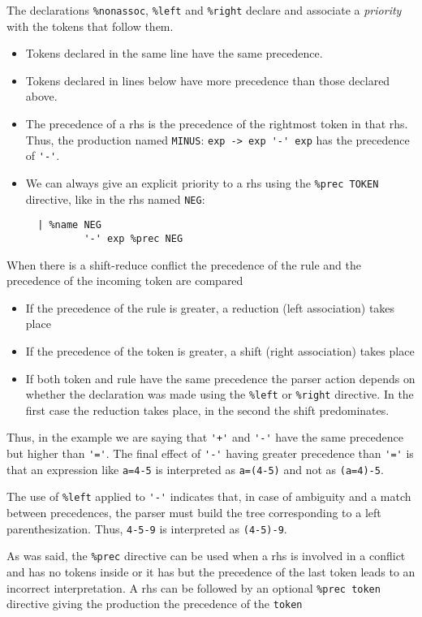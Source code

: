 The declarations 
\verb|%nonassoc|, \verb|%left| and \verb|%right| 
declare and associate a {\it priority} with the tokens
that follow them.  

\begin{itemize}
\item
Tokens declared in the same line have the same precedence. 
\item
Tokens declared in lines below have more
precedence than those declared above. 
\item 
The precedence of a rhs is the precedence of the rightmost token  
in that rhs. Thus, the production named \verb|MINUS|: \verb|exp -> exp '-' exp|
has the precedence of \verb|'-'|.
\item
We can always give an explicit priority to a rhs using the \verb|%prec TOKEN| directive,
like in the rhs named \verb|NEG|:
\begin{verbatim}
  | %name NEG
          '-' exp %prec NEG
\end{verbatim}
\end{itemize}
When there is a shift-reduce conflict the precedence of the rule and the precedence of the
incoming token are compared
\begin{itemize}
\item
If the precedence of the rule is greater, a reduction (left association) takes place
\item 
If the precedence of the token is greater, a shift (right association) takes place
\item
If both token and rule have the same precedence the parser action depends on whether
the declaration was made using the \verb|%left| or \verb|%right| directive. In the
first case the reduction takes place, in the second the shift predominates.
\end{itemize}
Thus, in the example
we are saying that \verb|'+'| and \verb|'-'| have the same precedence
but higher than \verb|'='|. The final effect of \verb|'-'|
having greater precedence than \verb|'='| is that an
expression like \verb|a=4-5| is interpreted as \verb|a=(4-5)| 
and not as \verb|(a=4)-5|.  

The use of \verb|%left| applied to \verb|'-'|
indicates that, in case of ambiguity 
and a match between precedences,  
the parser must build the tree corresponding
to a left parenthesization. Thus, \verb|4-5-9| 
is interpreted as  \verb|(4-5)-9|.

As was said, the \verb|%prec| directive can be used when
a rhs is involved in a conflict and has no tokens
inside or it has but the precedence of the last token leads
to an incorrect interpretation. A rhs can be followed by 
an optional \verb|%prec token| directive
giving the production the precedence of the \verb|token|

